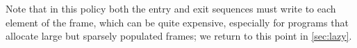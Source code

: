 \documentclass[acmsmall,review,anonymous]{acmart}\settopmatter{printfolios=true,printccs=false,printacmref=false}
\begin{document}
{%




Note that in this policy both the entry and exit sequences
must write to each element of
the frame, which can be quite expensive, especially for programs that
allocate large but sparsely populated frames; we return to this point
in \cref{sec:lazy}.
%

}
\end{document}
